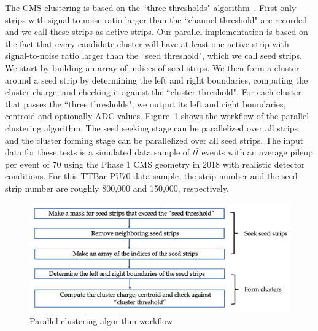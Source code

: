 \documentclass[10pt, paper=a4, UKenglish]{article}
\begin{document}
The CMS clustering is based on the ``three thresholds" algorithm~\cite{Collaboration_2014}. First only strips with signal-to-noise ratio larger than the ``channel threshold" are recorded and we call these strips as active strips. Our parallel implementation is based on the fact that every candidate cluster will have at least one active strip with signal-to-noise ratio larger than the ``seed threshold", which we call seed strips. We start by building an array of indices of seed strips. We then form a cluster around a seed strip by determining the left and right boundaries, computing the cluster charge, and checking it against the ``cluster threshold". For each cluster that passes the ``three thresholds", we output its left and right boundaries, centroid and optionally ADC values. Figure~\ref{fig:workflow} shows the workflow of the parallel clustering algorithm. The seed seeking stage can be parallelized over all strips and the cluster forming stage can be parallelized over all seed strips. The input data for these tests is a simulated data sample of $t\bar{t}$ events with an average pileup per event of 70 using the Phase 1 CMS geometry in 2018 with realistic detector conditions. For this TTBar PU70 data sample, the strip number and the seed strip number are roughly 800,000 and 150,000, respectively. 

\begin{figure}[!htb]
  \centering
  \includegraphics[scale=0.4]{workflow}
  \caption{Parallel clustering algorithm workflow}
  \label{fig:workflow}
\end{figure}
\end{document}
